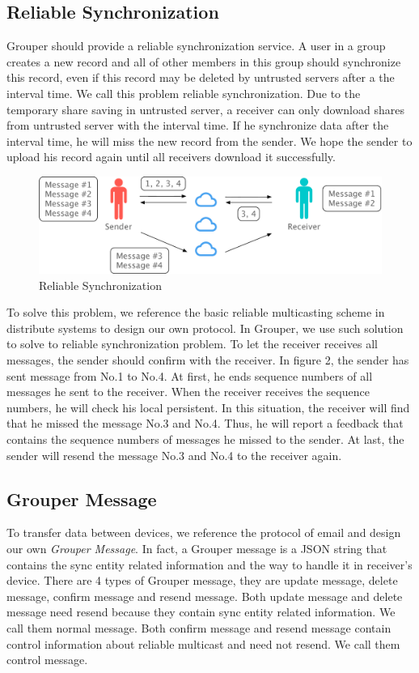 \documentclass[twocolumn,10pt]{article}
\begin{document}
\subsection{Reliable Synchronization}
Grouper should provide a reliable synchronization service. A user in a group creates a new record and all of other members in this group should synchronize this record, even if this record may be deleted by untrusted servers after a the interval time. We call this problem reliable synchronization. Due to the temporary share saving in untrusted server, a receiver can only download shares from untrusted server with the interval time. If he synchronize data after the interval time, he will miss the new record from the sender. We hope the sender to upload his  record again until all receivers download it successfully.

\begin{figure}[!htb]
	\centering
	\includegraphics[scale=0.3]{reliable_sync}
	\caption{Reliable Synchronization}
\end{figure}

To solve this problem, we reference the basic reliable multicasting scheme in distribute systems to design our own protocol. In Grouper, we use such solution to solve to reliable synchronization problem. To let the receiver receives all messages, the sender should confirm with the receiver. In figure 2, the sender has sent message from No.1 to No.4. At first, he ends sequence numbers of all messages he sent to the receiver. When the receiver receives the sequence numbers, he will check his local persistent. In this situation, the receiver will find that he missed the message No.3 and No.4. Thus, he will report a feedback that contains the sequence numbers of messages he missed to the sender. At last, the sender will resend the message No.3 and No.4 to the receiver again.

\subsection{Grouper Message}

To transfer data between devices, we reference the protocol of email and design our own \emph{Grouper Message}. In fact, a Grouper message is a JSON string that contains the sync entity related information and the way to handle it in receiver’s device. There are 4 types of Grouper message, they are update message, delete message, confirm message and resend message. Both update message and delete message need resend because they contain sync entity related information. We call them normal message. Both confirm message and resend message contain control information about reliable multicast and need not resend. We call them control message.
\end{document}
